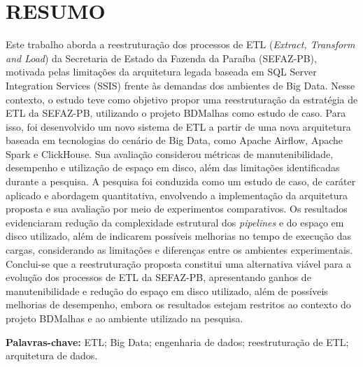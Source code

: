 
\thispagestyle{empty}
\section*{\normalsize \centering \textbf{RESUMO}}

\noindent  

Este trabalho aborda a reestruturação dos processos de ETL (\textit{Extract, Transform and Load}) da Secretaria 
de Estado da Fazenda da Paraíba (SEFAZ-PB), motivada pelas limitações da arquitetura legada baseada em SQL Server 
Integration Services (SSIS) frente às demandas dos ambientes de Big Data. Nesse contexto, o estudo teve como 
objetivo propor uma reestruturação da estratégia de ETL da SEFAZ-PB, utilizando o projeto BDMalhas como estudo de 
caso. Para isso, foi desenvolvido um novo sistema de ETL a partir de uma nova arquitetura baseada em tecnologias
do cenário de Big Data, como Apache Airflow, Apache Spark e ClickHouse. Sua avaliação considerou métricas de
manutenibilidade, desempenho e utilização de espaço em disco, além das limitações identificadas durante a pesquisa.
A pesquisa foi conduzida como um estudo de caso, de caráter aplicado e abordagem quantitativa, envolvendo a 
implementação da arquitetura proposta e sua avaliação por meio de experimentos comparativos. Os resultados 
evidenciaram redução da complexidade estrutural dos \textit{pipelines} e do espaço em disco utilizado, além de 
indicarem possíveis melhorias no tempo de execução das cargas, considerando as limitações e diferenças entre os 
ambientes experimentais. Conclui-se que a reestruturação proposta constitui uma alternativa viável para a evolução 
dos processos de ETL da SEFAZ-PB, apresentando ganhos de manutenibilidade e redução do espaço em disco utilizado, 
além de possíveis melhorias de desempenho, embora os resultados estejam restritos ao
contexto do projeto BDMalhas e ao ambiente utilizado na pesquisa.

\vspace*{0.5cm}

\noindent\textbf{Palavras-chave:} ETL; Big Data; engenharia de dados; reestruturação de ETL; arquitetura de dados.
 \newpage
